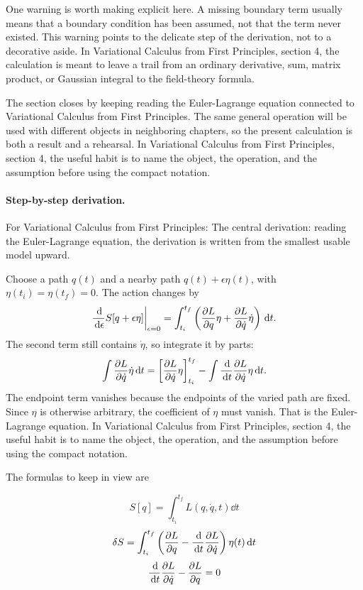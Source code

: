 One warning is worth making explicit here.  A missing boundary term usually means that a boundary condition has been assumed, not that the term never existed.  This warning points to the delicate step of the derivation, not to a decorative aside.  In Variational Calculus from First Principles, section 4, the calculation is meant to leave a trail from an ordinary derivative, sum, matrix product, or Gaussian integral to the field-theory formula.

The section closes by keeping reading the Euler-Lagrange equation connected to Variational Calculus from First Principles.  The same general operation will be used with different objects in neighboring chapters, so the present calculation is both a result and a rehearsal.  In Variational Calculus from First Principles, section 4, the useful habit is to name the object, the operation, and the assumption before using the compact notation.



\paragraph{Step-by-step derivation.}

For Variational Calculus from First Principles: The central derivation: reading the Euler-Lagrange equation, the derivation is written from the smallest usable model upward.

Choose a path \(q(t)\) and a nearby path \(q(t)+\epsilon\eta(t)\), with \(\eta(t_i)=\eta(t_f)=0\).  The action changes by
\[
  \frac{\,\mathrm d}{\,\mathrm d\epsilon}S[q+\epsilon\eta]\bigg|_{\epsilon=0}
  =
  \int_{t_i}^{t_f}
  \left(
  \frac{\partial L}{\partial q}\eta+\frac{\partial L}{\partial\dot q}\dot\eta
  \right)\,\mathrm d t.
\]
The second term still contains \(\dot\eta\), so integrate it by parts:
\[
  \int \frac{\partial L}{\partial\dot q}\dot\eta\,\mathrm d t
  =
  \left[\frac{\partial L}{\partial\dot q}\eta\right]_{t_i}^{t_f}
  -
  \int \frac{\,\mathrm d}{\,\mathrm d t}\frac{\partial L}{\partial\dot q}\eta\,\mathrm d t.
\]
The endpoint term vanishes because the endpoints of the varied path are fixed.  Since \(\eta\) is otherwise arbitrary, the coefficient of \(\eta\) must vanish.  That is the Euler-Lagrange equation.  In Variational Calculus from First Principles, section 4, the useful habit is to name the object, the operation, and the assumption before using the compact notation.

The formulas to keep in view are

\[
  S[q]=\int_{t_i}^{t_f}L(q,\dot q,t)\dd t
\]
\[
  \delta S=\int_{t_i}^{t_f}\left(\frac{\partial L}{\partial q}-\frac{\,\mathrm d}{\,\mathrm d t}\frac{\partial L}{\partial\dot q}\right)\eta(t)\,\mathrm d t
\]
\[
  \frac{\,\mathrm d}{\,\mathrm d t}\frac{\partial L}{\partial\dot q}-\frac{\partial L}{\partial q}=0
\]

